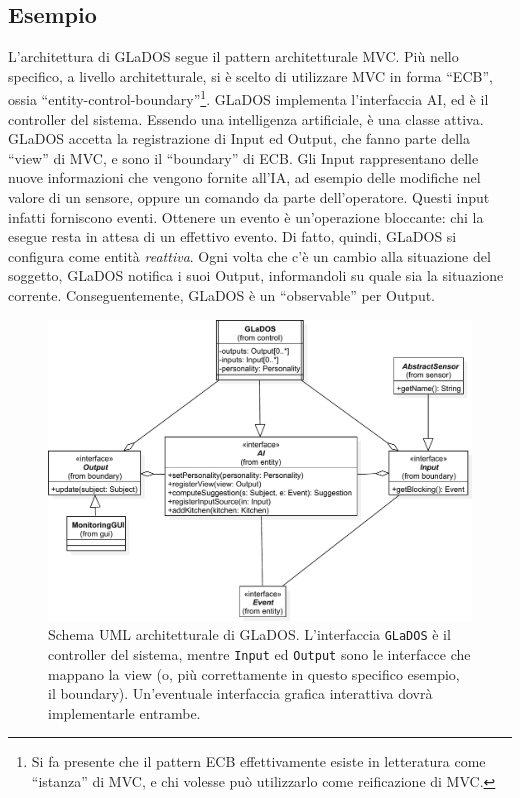 \documentclass[a4paper,12pt]{report}
\begin{document}
\subsection*{Esempio}

L'architettura di GLaDOS segue il pattern architetturale MVC.
%
Più nello specifico, a livello architetturale, si è scelto di utilizzare MVC in forma ``ECB'', ossia ``entity-control-boundary''\footnote{
	Si fa presente che il pattern ECB effettivamente esiste in letteratura come ``istanza'' di MVC, e chi volesse può utilizzarlo come reificazione di MVC.
}.
%
GLaDOS implementa l'interfaccia AI, ed è il controller del sistema.
Essendo una intelligenza artificiale, è una classe attiva.
%
GLaDOS accetta la registrazione di Input ed Output, che fanno parte della ``view'' di MVC, e sono il ``boundary'' di ECB.
Gli Input rappresentano delle nuove informazioni che vengono fornite all'IA, ad esempio delle modifiche nel valore di un sensore, oppure un comando da parte dell'operatore.
Questi input infatti forniscono eventi.
Ottenere un evento è un'operazione bloccante: chi la esegue resta in attesa di un effettivo evento.
Di fatto, quindi, GLaDOS si configura come entità \textit{reattiva}.
Ogni volta che c'è un cambio alla situazione del soggetto, GLaDOS notifica i suoi Output,
informandoli su quale sia la situazione corrente.
%
Conseguentemente, GLaDOS è un ``observable'' per Output.

\begin{figure}[h]
	\centering{}
	\includegraphics[width=\textwidth,scale=0.5]{img/arch}
	\caption{Schema UML architetturale di GLaDOS. L'interfaccia \texttt{GLaDOS} è il controller del sistema, mentre \texttt{Input} ed \texttt{Output} sono le interfacce che mappano la view (o, più correttamente in questo specifico esempio, il boundary). Un'eventuale interfaccia grafica interattiva dovrà implementarle entrambe.}
	\label{img:goodarch}
\end{figure}
\end{document}

